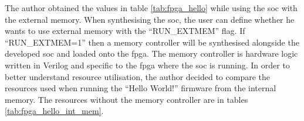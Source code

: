 
The author obtained the values in table \ref{tab:fpga_hello} while using the \acrshort{soc} with the external memory. When synthesising the \acrshort{soc}, the user can define whether he wants to use external memory with the \enquote{RUN\_EXTMEM} flag. If \enquote{RUN\_EXTMEM=1} then a memory controller will be synthesised alongside the developed \acrshort{soc} and loaded onto the \acrshort{fpga}. The memory controller is hardware logic written in Verilog and specific to the \acrshort{fpga} where the \acrshort{soc} is running. In order to better understand resource utilisation, the author decided to compare the resources used when running the \enquote{Hello World!} firmware from the internal memory. The resources without the memory controller are in tables \ref{tab:fpga_hello_int_mem}.

